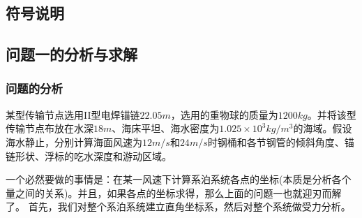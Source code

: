     \subsection{符号说明}
    \subsection{问题一的分析与求解}
        \subsubsection{问题的分析}
            \par
            某型传输节点选用II型电焊锚链$22.05m$，选用的重物球的质量为$1200kg$。并将该型传输节点布放在水深$18m$、海床平坦、海水密度为$1.025\times 10^3kg/m^3$的海域。假设海水静止，分别计算海面风速为$12m/s$和$24m/s$时钢桶和各节钢管的倾斜角度、锚链形状、浮标的吃水深度和游动区域。
            \par
            一个必然要做的事情是：在某一风速下计算系泊系统各点的坐标(本质是分析各个量之间的关系)。并且，如果各点的坐标求得，那么上面的问题一也就迎刃而解了。
            首先，我们对整个系泊系统建立直角坐标系，然后对整个系统做受力分析。
